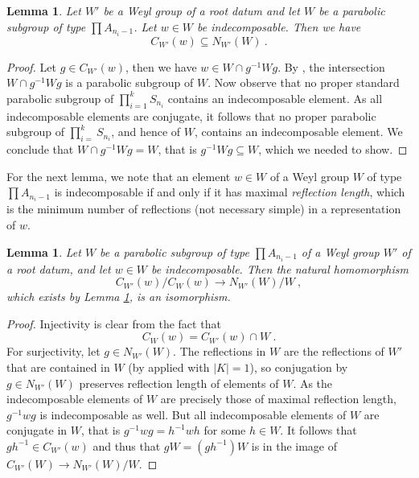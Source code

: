 \documentclass[10pt, a4paper]{amsart}
\newtheorem{lemma}[theorem]{Lemma}
\theoremstyle{definition}
\theoremstyle{myitemstyle}
\begin{document}
\begin{lemma}
\label{lem:centralizer contained in normalizer}
Let $W'$ be a Weyl group of a root datum and let $W$ be a parabolic subgroup of type $\prod A_{n_i-1}$. Let $w\in W$ be indecomposable. Then we have
\[
    C_{W'}(w)\subseteq N_{W'}(W) \ .
\]
\end{lemma}

\begin{proof}
Let $g\in C_{W'}(w)$, then we have $w\in W\cap g^{-1}Wg$. By \cite[Lemma 2.25]{Buildings}, the intersection $W\cap g^{-1}Wg$ is a parabolic subgroup of $W$.  Now observe that no proper standard parabolic subgroup of $\prod_{i=1}^k S_{n_i}$ contains an indecomposable element. As all indecomposable elements are conjugate, it follows that no proper parabolic subgroup of $\prod_{i=}^k S_{n_i}$, and hence of $W$, contains an indecomposable element. We conclude that $W\cap g^{-1}Wg=W$, that is $g^{-1}Wg\subseteq W$, which we needed to show.
\end{proof}

For the next lemma, we note that an element $w\in W$ of a Weyl group $W$ of type $\prod A_{n_i-1}$ is indecomposable if and only if it has maximal \emph{reflection length}, which is the minimum number of reflections (not necessary simple) in a representation of $w$. 

\begin{lemma}
\label{lem:quotient of centralizers is relative Weyl group}
Let $W$ be a parabolic subgroup of type $\prod A_{n_i-1}$ of a Weyl group $W'$ of a root datum, and let $w\in W$ be indecomposable. Then the natural homomorphism
\[
    C_{W'}(w)/C_W(w)\longrightarrow N_{W'}(W)/W \ ,
\]
which exists by Lemma \ref{lem:centralizer contained in normalizer}, is an isomorphism.
\end{lemma}

\begin{proof}
Injectivity is clear from the fact that 
\[
    C_W(w)=C_{W'}(w)\cap W \ .
\]
For surjectivity, let $g\in N_{W'}(W)$. The reflections in $W$ are the reflections of $W'$ that are contained in $W$ (by \cite[Lemma 2.25]{Buildings} applied with $|K|=1$), so conjugation by $g\in N_{W'}(W)$ preserves reflection length of elements of $W$. As the indecomposable elements of $W$ are precisely those of maximal reflection length, $g^{-1}wg$ is indecomposable as well. But all indecomposable elements of $W$ are conjugate in $W$, that is $g^{-1}wg=h^{-1}wh$ for some $h\in W$. It follows that $gh^{-1}\in C_{W'}(w)$ and thus that $gW=(gh^{-1})W$ is in the image of $C_{W'}(W)\to N_{W'}(W)/W$. 
\end{proof}
\end{document}
